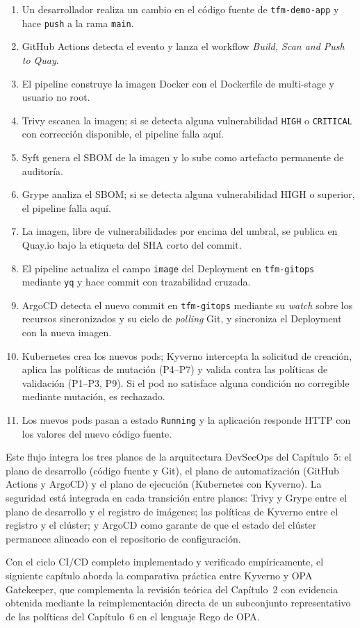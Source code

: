 \begin{enumerate}
  \item Un desarrollador realiza un cambio en el código fuente de \texttt{tfm-demo-app} y hace \texttt{push} a la rama \texttt{main}.
  \item GitHub Actions detecta el evento y lanza el workflow \textit{Build, Scan and Push to Quay}.
  \item El pipeline construye la imagen Docker con el Dockerfile de multi-stage y usuario no root.
  \item Trivy escanea la imagen; si se detecta alguna vulnerabilidad \texttt{HIGH} o \texttt{CRITICAL} con corrección disponible, el pipeline falla aquí.
  \item Syft genera el SBOM de la imagen y lo sube como artefacto permanente de auditoría.
  \item Grype analiza el SBOM; si se detecta alguna vulnerabilidad HIGH o superior, el pipeline falla aquí.
  \item La imagen, libre de vulnerabilidades por encima del umbral, se publica en Quay.io bajo la etiqueta del SHA corto del commit.
  \item El pipeline actualiza el campo \texttt{image} del Deployment en \texttt{tfm-gitops} mediante \texttt{yq} y hace commit con trazabilidad cruzada.
  \item ArgoCD detecta el nuevo commit en \texttt{tfm-gitops} mediante su \textit{watch} sobre los recursos sincronizados y su ciclo de \textit{polling} Git, y sincroniza el Deployment con la nueva imagen.
  \item Kubernetes crea los nuevos pods; Kyverno intercepta la solicitud de creación, aplica las políticas de mutación (P4--P7) y valida contra las políticas de validación (P1--P3, P9). Si el pod no satisface alguna condición no corregible mediante mutación, es rechazado.
  \item Los nuevos pods pasan a estado \texttt{Running} y la aplicación responde HTTP con los valores del nuevo código fuente.
\end{enumerate}

Este flujo integra los tres planos de la arquitectura DevSecOps del Capítulo~5: el plano de desarrollo (código fuente y Git), el plano de automatización (GitHub Actions y ArgoCD) y el plano de ejecución (Kubernetes con Kyverno). La seguridad está integrada en cada transición entre planos: Trivy y Grype entre el plano de desarrollo y el registro de imágenes; las políticas de Kyverno entre el registro y el clúster; y ArgoCD como garante de que el estado del clúster permanece alineado con el repositorio de configuración.

Con el ciclo CI/CD completo implementado y verificado empíricamente, el siguiente capítulo aborda la comparativa práctica entre Kyverno y OPA Gatekeeper, que complementa la revisión teórica del Capítulo~2 con evidencia obtenida mediante la reimplementación directa de un subconjunto representativo de las políticas del Capítulo~6 en el lenguaje Rego de OPA.
